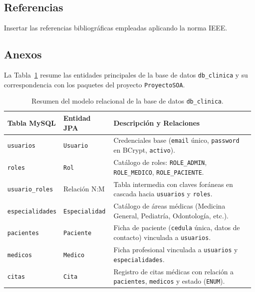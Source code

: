 \documentclass{article}
\begin{document}
\subsection{Referencias}
Insertar las referencias bibliográficas empleadas aplicando la norma IEEE.

\vspace{-3em} %
\renewcommand{\refname}{}



\subsection{Anexos}
La Tabla~\ref{tab:anexo_bd} resume las entidades principales de la base de datos \texttt{db\_clinica} y su correspondencia con los paquetes del proyecto \texttt{ProyectoSOA}.

\begin{table}[H]
\centering
\caption{Resumen del modelo relacional de la base de datos \texttt{db\_clinica}.}
\label{tab:anexo_bd}
\small
\begin{tabularx}{\textwidth}{@{} l l X @{}}
\toprule
\textbf{Tabla MySQL} & \textbf{Entidad JPA} & \textbf{Descripción y Relaciones} \\
\midrule
\texttt{usuarios} & \texttt{Usuario} & Credenciales base (\texttt{email} único, \texttt{password} en BCrypt, \texttt{activo}). \\
\texttt{roles} & \texttt{Rol} & Catálogo de roles: \texttt{ROLE\_ADMIN}, \texttt{ROLE\_MEDICO}, \texttt{ROLE\_PACIENTE}. \\
\texttt{usuario\_roles} & Relación N:M & Tabla intermedia con claves foráneas en cascada hacia \texttt{usuarios} y \texttt{roles}. \\
\texttt{especialidades} & \texttt{Especialidad} & Catálogo de áreas médicas (Medicina General, Pediatría, Odontología, etc.). \\
\texttt{pacientes} & \texttt{Paciente} & Ficha de paciente (\texttt{cedula} única, datos de contacto) vinculada a \texttt{usuarios}. \\
\texttt{medicos} & \texttt{Medico} & Ficha profesional vinculada a \texttt{usuarios} y \texttt{especialidades}. \\
\texttt{citas} & \texttt{Cita} & Registro de citas médicas con relación a \texttt{pacientes}, \texttt{medicos} y estado (\texttt{ENUM}). \\
\bottomrule
\end{tabularx}
\end{table}

\vfill
\end{document}
